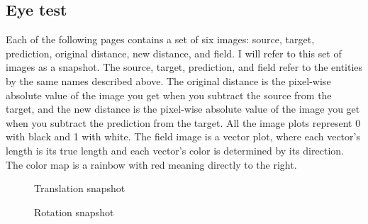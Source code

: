 \documentclass[12pt,a4paper]{article}
\begin{document}
\subsection{Eye test}

Each of the following pages contains a set of six images: source, target, prediction, original distance, new distance, and field. I will refer to this set of images as a snapshot. The source, target, prediction, and field refer to the entities by the same names described above. The original distance is the pixel-wise absolute value of the image you get when you subtract the source from the target, and the new distance is the pixel-wise absolute value of the image you get when you subtract the prediction from the target. All the image plots represent 0 with black and 1 with white. The field image is a vector plot, where each vector's length is its true length and each vector's color is determined by its direction. The color map is a rainbow with red meaning directly to the right.

\newpage

\begin{figure}[H]
\centering
{}
\hspace{3mm}
\hspace{0mm}
\hspace{3mm}
\hspace{0mm}
\hspace{3mm}
\caption{Translation snapshot}
\end{figure}

\newpage

\begin{figure}[H]
\centering
{}
\hspace{3mm}
\hspace{0mm}
\hspace{3mm}
\hspace{0mm}
\hspace{3mm}
\caption{Rotation snapshot}
\end{figure}
\end{document}
